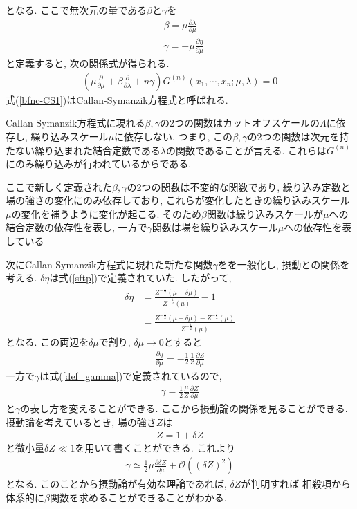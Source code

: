 となる.
ここで無次元の量である$\beta$と$\gamma$を
\begin{align}
  &\beta = \mu\frac{\partial \lambda}{\partial \mu}\label{def_beta}\\
  &\gamma = -\mu\frac{\partial \eta}{\partial \mu} \label{def_gamma}
\end{align}
と定義すると, 次の関係式が得られる.
\begin{align}
  \left(\mu \frac{\partial }{\partial \mu} + \beta \frac{\partial}{\partial \lambda} + n \gamma\right) G^{(n)}(x_1,\cdots,x_n;\mu,\lambda) = 0 \label{bfnc-CS1}
\end{align}
式(\ref{bfnc-CS1})はCallan-Symanzik方程式と呼ばれる. \cite{callanBrokenScaleInvariance1970,symanzikSmallDistanceBehaviour1970,symanzikSmalldistancebehaviourAnalysisWilson1971}

Callan-Symanzik方程式に現れる$\beta, \gamma$の2つの関数はカットオフスケールの$\Lambda$に依存し, 繰り込みスケール$\mu$に依存しない.
つまり, この$\beta, \gamma$の2つの関数は次元を持たない繰り込まれた結合定数である$\lambda$の関数であることが言える.
これらは$G^{(n)}$にのみ繰り込みが行われているからである.

ここで新しく定義された$\beta, \gamma$の2つの関数は不変的な関数であり, 繰り込み定数と場の強さの変化にのみ依存しており, これらが変化したときの繰り込みスケール$\mu$の変化を補うように変化が起こる. 
そのため$\beta$関数は繰り込みスケールが$\mu$への結合定数の依存性を表し, 一方で$\gamma$関数は場を繰り込みスケール$\mu$への依存性を表している

次にCallan-Symanzik方程式に現れた新たな関数$\gamma$をを一般化し, 摂動との関係を考える.
$\delta \eta$は式(\ref{sftp})で定義されていた.
したがって,
\begin{align}
  \delta \eta &= \frac{Z^{-\frac{1}{2}}(\mu+\delta \mu)}{Z^{-\frac{1}{2}}(\mu)}-1\nonumber\\
              &= \frac{Z^{-\frac{1}{2}}(\mu+\delta \mu)-Z^{-\frac{1}{2}}(\mu)}{Z^{-\frac{1}{2}}(\mu)}
\end{align}
となる.
この両辺を$\delta \mu$で割り, $\delta \mu\rightarrow0$とすると
\begin{align}
  \frac{\partial \eta}{\partial \mu} = -\frac{1}{2}\frac{1}{Z}\frac{\partial Z}{\partial \mu}
\end{align}
一方で$\gamma$は式(\ref{def_gamma})で定義されているので,
\begin{align}
  \gamma = \frac{1}{2}\frac{\mu}{Z} \frac{\partial Z}{\partial \mu}\label{def_gamma_correct}
\end{align}
と$\gamma$の表し方を変えることができる.
ここから摂動論の関係を見ることができる.
摂動論を考えているとき, 場の強さ$Z$は
\begin{align}
  Z = 1 +\delta Z
\end{align}
と微小量$\delta Z \ll 1$を用いて書くことができる.
これより
\begin{align}
  \gamma \simeq \frac{1}{2}\mu \frac{\partial \delta Z}{\partial \mu} + \mathcal{O}((\delta Z)^2)
\end{align}
となる.
このことから摂動論が有効な理論であれば, $\delta Z$が判明すれば 相殺項から体系的に$\beta$関数を求めることができることがわかる.

